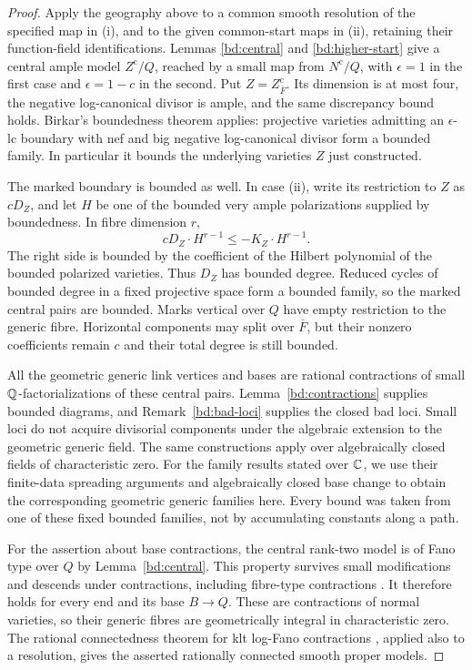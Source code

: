 \begin{proof}
Apply the geography above to a common smooth resolution of the
specified map in \textup{(i)}, and to the given common-start maps in
\textup{(ii)}, retaining their function-field identifications. Lemmas
\ref{bd:central} and \ref{bd:higher-start} give a central ample
model $Z^{\mathrm c}/Q$, reached by a small map from
$N^{\mathrm c}/Q$, with $\epsilon=1$ in the first case
and $\epsilon=1-c$ in the second. Put
$Z=Z^{\mathrm c}_{\overline F}$. Its dimension is at most four,
the negative log-canonical divisor is ample, and the same
discrepancy bound holds.  Birkar's boundedness theorem
\cite[Theorem~1.1]{BirkarBAB21} applies: projective varieties
admitting an $\epsilon$-lc boundary with nef and big negative
log-canonical divisor form a bounded family. In particular
it bounds the underlying varieties $Z$ just constructed.

The marked boundary is bounded as well. In case \textup{(ii)},
write its restriction to $Z$ as $cD_Z$, and let $H$ be one of
the bounded very ample polarizations supplied by boundedness.
In fibre dimension $r$,
\[
              cD_Z\cdot H^{r-1}\leq -K_Z\cdot H^{r-1}.
\]
The right side is bounded by the coefficient of the Hilbert
polynomial of the bounded polarized varieties. Thus $D_Z$
has bounded degree.  Reduced cycles of bounded degree in a
fixed projective space form a bounded family, so the marked
central pairs are bounded. Marks vertical over $Q$ have empty
restriction to the generic fibre. Horizontal components may split
over $\overline F$, but their nonzero coefficients remain $c$
and their total degree is still bounded.

All the geometric generic link vertices and bases are
rational contractions of small $\mathbb Q$-factorializations of
these central pairs.  Lemma~\ref{bd:contractions} supplies
bounded diagrams, and Remark~\ref{bd:bad-loci} supplies the
closed bad loci.  Small loci do not acquire divisorial
components under the algebraic extension to the geometric
generic field. The same constructions apply over algebraically closed
fields of characteristic zero. For the family results stated over
$\mathbb C$, we use their finite-data spreading arguments and algebraically
closed base change to obtain the corresponding geometric generic
families here.
Every bound was taken from one of these fixed bounded
families, not by accumulating constants along a path.

For the assertion about base contractions, the central rank-two
model is of Fano type over $Q$ by Lemma~\ref{bd:central}.
This property survives small modifications and descends under
contractions, including fibre-type contractions
\cite[Lemma~2.8, with the relative convention after
Lemma--Definition~2.6]{ProkhorovShokurov09}.
It therefore holds for every end and its base $B\to Q$.
These are contractions of normal varieties, so their generic
fibres are geometrically integral in characteristic zero.
The rational connectedness theorem for klt log-Fano
contractions \cite{HM07Vertical}, applied also to a resolution,
gives the asserted rationally connected smooth proper models.
\end{proof}

